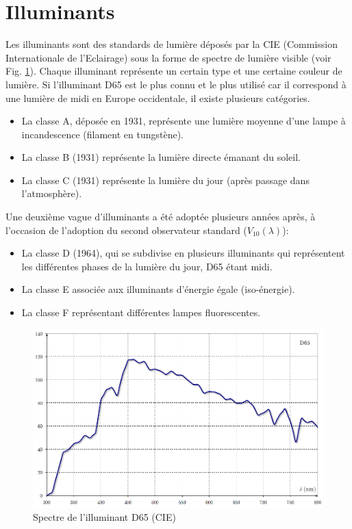 	\section{Illuminants}
	\par Les illuminants sont des standards de lumière déposés par la CIE (Commission Internationale de l'Eclairage) sous la forme de spectre de lumière visible (voir Fig. \ref{fig:illuminant_d65}). Chaque illuminant représente un certain type et une certaine couleur de lumière. Si l'illuminant D65 est le plus connu et le plus utilisé car il correspond à une lumière de midi en Europe occidentale, il existe plusieurs catégories.
	\begin{itemize}
	\item La classe A, déposée en 1931, représente une lumière moyenne d'une lampe à incandescence (filament en tungstène).
	\item La classe B (1931) représente la lumière directe émanant du soleil.
	\item La classe C (1931) représente la lumière du jour (après passage dans l'atmosphère).
	\end{itemize}

	\par Une deuxième vague d'illuminants a été adoptée plusieurs années après, à l'occasion de l'adoption du second observateur standard ($V_{10}(\lambda)$):
	\begin{itemize}
	\item La classe D (1964), qui se subdivise en plusieurs illuminants qui représentent les différentes phases de la lumière du jour, D65 étant midi.
	\item La classe E associée aux illuminants d'énergie égale (iso-énergie).
	\item La classe F représentant différentes lampes fluorescentes.
	\end{itemize}
	
	\begin{figure}[h]
		\centering
		\includegraphics[scale=0.45]{Figures/IlluminantD65}
		\caption{Spectre de l'illuminant D65 (CIE)}
		\label{fig:illuminant_d65}
	\end{figure}
	
